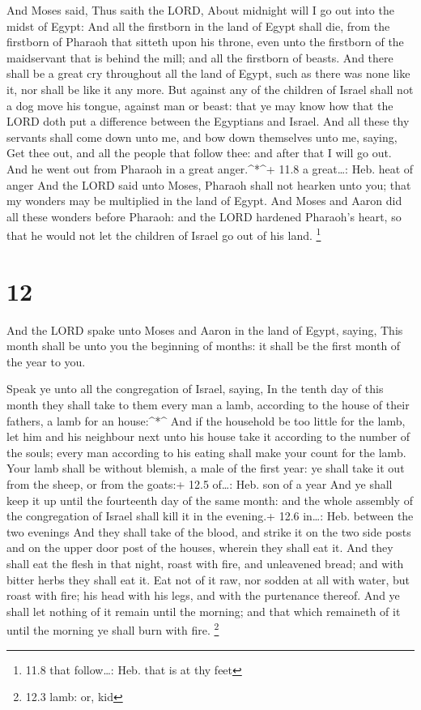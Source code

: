  And Moses said, Thus saith the LORD, About midnight will I
go out into the midst of Egypt:  And all the firstborn in
the land of Egypt shall die, from the firstborn of Pharaoh that sitteth
upon his throne, even unto the firstborn of the maidservant that is
behind the mill; and all the firstborn of beasts.  And there
shall be a great cry throughout all the land of Egypt, such as there was
none like it, nor shall be like it any more.  But against
any of the children of Israel shall not a dog move his tongue, against
man or beast: that ye may know how that the LORD doth put a difference
between the Egyptians and Israel.  And all these thy
servants shall come down unto me, and bow down themselves unto me,
saying, Get thee out, and all the people that follow thee: and after
that I will go out. And he went out from Pharaoh in a great
anger.\^{}*\^{}+ 11.8 a great\ldots: Heb. heat of anger  And
the LORD said unto Moses, Pharaoh shall not hearken unto you; that my
wonders may be multiplied in the land of Egypt.  And Moses
and Aaron did all these wonders before Pharaoh: and the LORD hardened
Pharaoh's heart, so that he would not let the children of Israel go out
of his land. \footnote{11.8 that follow\ldots: Heb. that is at thy feet}

\hypertarget{section-11}{%
\section{12}\label{section-11}}

 And the LORD spake unto Moses and Aaron in the land of
Egypt, saying,  This month shall be unto you the beginning
of months: it shall be the first month of the year to you.

 Speak ye unto all the congregation of Israel, saying, In
the tenth day of this month they shall take to them every man a lamb,
according to the house of their fathers, a lamb for an house:\^{}*\^{}
 And if the household be too little for the lamb, let him
and his neighbour next unto his house take it according to the number of
the souls; every man according to his eating shall make your count for
the lamb.  Your lamb shall be without blemish, a male of the
first year: ye shall take it out from the sheep, or from the goats:+
12.5 of\ldots: Heb. son of a year  And ye shall keep it up
until the fourteenth day of the same month: and the whole assembly of
the congregation of Israel shall kill it in the evening.+ 12.6 in\ldots:
Heb. between the two evenings  And they shall take of the
blood, and strike it on the two side posts and on the upper door post of
the houses, wherein they shall eat it.  And they shall eat
the flesh in that night, roast with fire, and unleavened bread; and with
bitter herbs they shall eat it.  Eat not of it raw, nor
sodden at all with water, but roast with fire; his head with his legs,
and with the purtenance thereof.  And ye shall let nothing
of it remain until the morning; and that which remaineth of it until the
morning ye shall burn with fire. \footnote{12.3 lamb: or, kid}

